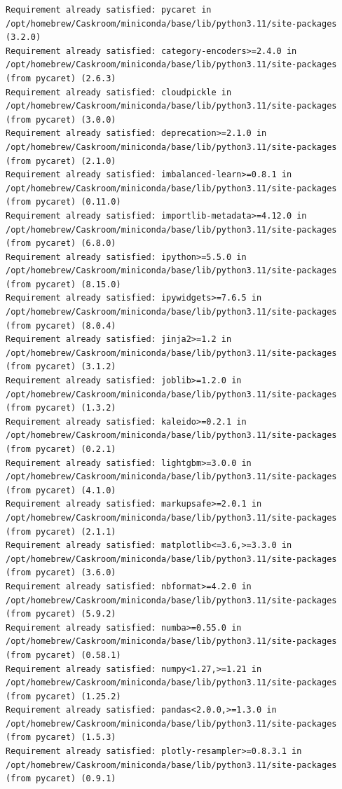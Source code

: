 \documentclass[
  letterpaper,
  DIV=11,
  numbers=noendperiod]{scrartcl}
\begin{document}
\begin{verbatim}
Requirement already satisfied: pycaret in /opt/homebrew/Caskroom/miniconda/base/lib/python3.11/site-packages (3.2.0)
Requirement already satisfied: category-encoders>=2.4.0 in /opt/homebrew/Caskroom/miniconda/base/lib/python3.11/site-packages (from pycaret) (2.6.3)
Requirement already satisfied: cloudpickle in /opt/homebrew/Caskroom/miniconda/base/lib/python3.11/site-packages (from pycaret) (3.0.0)
Requirement already satisfied: deprecation>=2.1.0 in /opt/homebrew/Caskroom/miniconda/base/lib/python3.11/site-packages (from pycaret) (2.1.0)
Requirement already satisfied: imbalanced-learn>=0.8.1 in /opt/homebrew/Caskroom/miniconda/base/lib/python3.11/site-packages (from pycaret) (0.11.0)
Requirement already satisfied: importlib-metadata>=4.12.0 in /opt/homebrew/Caskroom/miniconda/base/lib/python3.11/site-packages (from pycaret) (6.8.0)
Requirement already satisfied: ipython>=5.5.0 in /opt/homebrew/Caskroom/miniconda/base/lib/python3.11/site-packages (from pycaret) (8.15.0)
Requirement already satisfied: ipywidgets>=7.6.5 in /opt/homebrew/Caskroom/miniconda/base/lib/python3.11/site-packages (from pycaret) (8.0.4)
Requirement already satisfied: jinja2>=1.2 in /opt/homebrew/Caskroom/miniconda/base/lib/python3.11/site-packages (from pycaret) (3.1.2)
Requirement already satisfied: joblib>=1.2.0 in /opt/homebrew/Caskroom/miniconda/base/lib/python3.11/site-packages (from pycaret) (1.3.2)
Requirement already satisfied: kaleido>=0.2.1 in /opt/homebrew/Caskroom/miniconda/base/lib/python3.11/site-packages (from pycaret) (0.2.1)
Requirement already satisfied: lightgbm>=3.0.0 in /opt/homebrew/Caskroom/miniconda/base/lib/python3.11/site-packages (from pycaret) (4.1.0)
Requirement already satisfied: markupsafe>=2.0.1 in /opt/homebrew/Caskroom/miniconda/base/lib/python3.11/site-packages (from pycaret) (2.1.1)
Requirement already satisfied: matplotlib<=3.6,>=3.3.0 in /opt/homebrew/Caskroom/miniconda/base/lib/python3.11/site-packages (from pycaret) (3.6.0)
Requirement already satisfied: nbformat>=4.2.0 in /opt/homebrew/Caskroom/miniconda/base/lib/python3.11/site-packages (from pycaret) (5.9.2)
Requirement already satisfied: numba>=0.55.0 in /opt/homebrew/Caskroom/miniconda/base/lib/python3.11/site-packages (from pycaret) (0.58.1)
Requirement already satisfied: numpy<1.27,>=1.21 in /opt/homebrew/Caskroom/miniconda/base/lib/python3.11/site-packages (from pycaret) (1.25.2)
Requirement already satisfied: pandas<2.0.0,>=1.3.0 in /opt/homebrew/Caskroom/miniconda/base/lib/python3.11/site-packages (from pycaret) (1.5.3)
Requirement already satisfied: plotly-resampler>=0.8.3.1 in /opt/homebrew/Caskroom/miniconda/base/lib/python3.11/site-packages (from pycaret) (0.9.1)

\end{verbatim}
\end{document}

